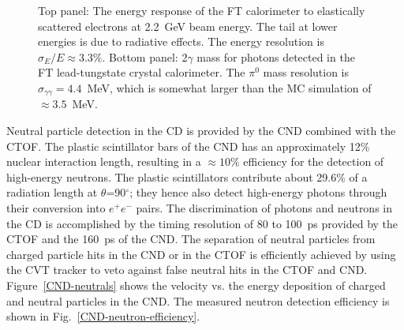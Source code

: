 \documentclass[final,3p,twocolumn]{elsarticle}
\begin{document}
\begin{figure}[t!]
\caption{Top panel: The energy response of the FT calorimeter to elastically scattered electrons at 2.2~GeV
  beam energy. The tail at lower energies is due to radiative effects. The energy resolution is
  $\sigma_E / E \approx 3.3\%$. Bottom panel: 2$\gamma$ mass for photons detected in the FT lead-tungstate
  crystal calorimeter. The $\pi^0$ mass resolution is $\sigma_{\gamma\gamma} = 4.4$~MeV, which is somewhat 
  larger than the MC simulation of $\approx 3.5$~MeV. }
\label{FT-en-gg}
\end{figure}

Neutral particle detection in the CD is provided by the CND combined with the CTOF. The plastic scintillator bars
of the CND has an approximately 12\% nuclear interaction length, resulting in a $\approx 10\%$ efficiency for
the detection of high-energy neutrons. The plastic scintillators contribute about 29.6\% of a radiation length at
$\theta$=90$^\circ$; they hence also detect high-energy photons through their conversion into $e^+e^-$ pairs. The
discrimination of photons and neutrons in the CD is accomplished by the timing resolution of 80 to 100~ps provided by the
CTOF and the 160~ps of the CND. The separation of neutral particles from charged particle hits in the CND or in
the CTOF is efficiently achieved by using the CVT tracker to veto against false neutral hits in the CTOF and CND.
Figure~\ref{CND-neutrals} shows the velocity vs. the energy deposition of charged and neutral particles in the
CND. The measured neutron detection efficiency is shown in Fig.~\ref{CND-neutron-efficiency}.
\end{document}
